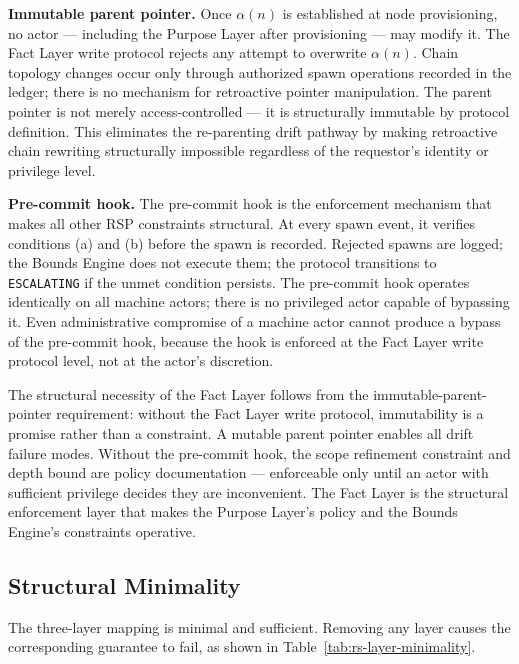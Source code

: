 \medskip
\noindent\textbf{Immutable parent pointer.} Once $\alpha(n)$ is established at node provisioning, no actor --- including the Purpose Layer after provisioning --- may modify it. The Fact Layer write protocol rejects any attempt to overwrite $\alpha(n)$. Chain topology changes occur only through authorized spawn operations recorded in the ledger; there is no mechanism for retroactive pointer manipulation. The parent pointer is not merely access-controlled --- it is structurally immutable by protocol definition. This eliminates the re-parenting drift pathway by making retroactive chain rewriting structurally impossible regardless of the requestor's identity or privilege level.

\medskip
\noindent\textbf{Pre-commit hook.} The pre-commit hook is the enforcement mechanism that makes all other RSP constraints structural. At every spawn event, it verifies conditions (a) and (b) before the spawn is recorded. Rejected spawns are logged; the Bounds Engine does not execute them; the protocol transitions to \texttt{ESCALATING} if the unmet condition persists. The pre-commit hook operates identically on all machine actors; there is no privileged actor capable of bypassing it. Even administrative compromise of a machine actor cannot produce a bypass of the pre-commit hook, because the hook is enforced at the Fact Layer write protocol level, not at the actor's discretion.

The structural necessity of the Fact Layer follows from the immutable-parent-pointer requirement: without the Fact Layer write protocol, immutability is a promise rather than a constraint. A mutable parent pointer enables all drift failure modes. Without the pre-commit hook, the scope refinement constraint and depth bound are policy documentation --- enforceable only until an actor with sufficient privilege decides they are inconvenient. The Fact Layer is the structural enforcement layer that makes the Purpose Layer's policy and the Bounds Engine's constraints operative.

\subsection{Structural Minimality}
\label{sec:rs-minimality}

The three-layer mapping is minimal and sufficient. Removing any layer causes the corresponding guarantee to fail, as shown in Table~\ref{tab:rs-layer-minimality}.

